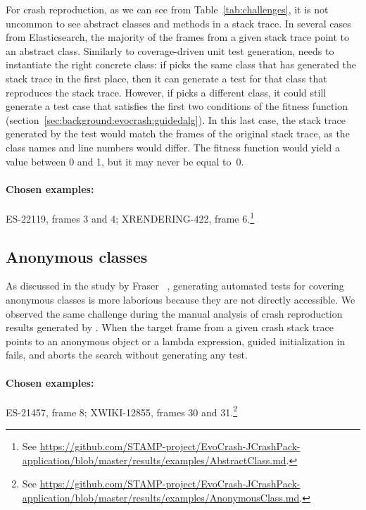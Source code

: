 For crash reproduction, as we can see from Table~\ref{tab:challenges}, it is not uncommon to see abstract classes and methods in a stack trace. 
In several cases from Elasticsearch, the majority of the frames from a given stack trace point to an abstract class.
Similarly to coverage-driven unit test generation, \evocrash needs to instantiate the right concrete class: if \evocrash picks the same class that has generated the stack trace in the first place, then it can generate a test for that class that reproduces the stack trace. 
However, if \evocrash picks a different class, it could still generate a test case that satisfies the first two conditions of the fitness function (section~\ref{sec:background:evocrash:guidedalg}). 
In this last case, the stack trace generated by the test would match the frames of the original stack trace, as the class names and line numbers would differ.
The fitness function would yield a value between 0 and 1, but it may never be equal to~0.

\paragraph{Chosen examples:} 
ES-22119, frames 3 and 4;
XRENDERING-422, frame 6.\footnote{See \url{https://github.com/STAMP-project/EvoCrash-JCrashPack-application/blob/master/results/examples/AbstractClass.md}.}


\subsection{Anonymous classes}

As discussed in the study by Fraser \etal~\cite{fraser2012whole}, generating automated tests for covering anonymous classes is more laborious because they are not directly accessible. 
We observed the same challenge during the manual analysis of crash reproduction results generated by \evocrash.
When the target frame from a given crash stack trace points to an anonymous object or a lambda expression, guided initialization in \evocrash fails, and \evocrash aborts the search without generating any test.

\paragraph{Chosen examples:} 
ES-21457, frame 8;
XWIKI-12855, frames 30 and 31.\footnote{See \url{https://github.com/STAMP-project/EvoCrash-JCrashPack-application/blob/master/results/examples/AnonymousClass.md}.}


